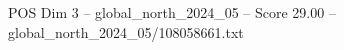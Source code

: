\begin{textsample}{POS Dim 3 – global\_north\_2024\_05 – Score 29.00 – global\_north\_2024\_05/108058661.txt}
\end{textsample}
